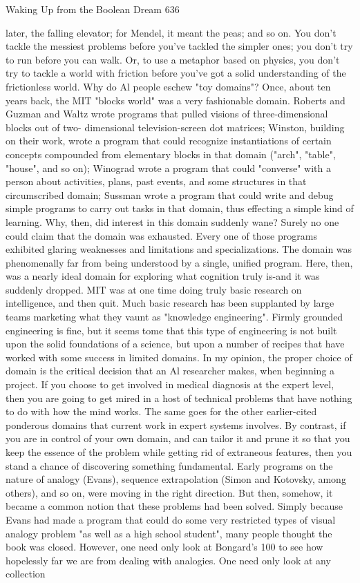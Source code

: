 Waking Up from the Boolean Dream                                                      636

later, the falling elevator; for Mendel, it meant the peas; and so on. You don't tackle
the messiest problems before you've tackled the simpler ones; you don't try to run
before you can walk. Or, to use a metaphor based on physics, you don't try to tackle a
world with friction before you've got a solid understanding of the frictionless world.
         Why do Al people eschew "toy domains"? Once, about ten years back, the
MIT "blocks world" was a very fashionable domain. Roberts and Guzman and Waltz
wrote programs that pulled visions of three-dimensional blocks out of two-
dimensional television-screen dot matrices; Winston, building on their work, wrote a
program that could recognize instantiations of certain concepts compounded from
elementary blocks in that domain ("arch", "table", "house", and so on); Winograd
wrote a program that could "converse" with a person about activities, plans, past
events, and some structures in that circumscribed domain; Sussman wrote a program
that could write and debug simple programs to carry out tasks in that domain, thus
effecting a simple kind of learning. Why, then, did interest in this domain suddenly
wane?
         Surely no one could claim that the domain was exhausted. Every one of those
programs exhibited glaring weaknesses and limitations and specializations. The
domain was phenomenally far from being understood by a single, unified program.
Here, then, was a nearly ideal domain for exploring what cognition truly is-and it was
suddenly dropped. MIT was at one time doing truly basic research on intelligence,
and then quit. Much basic research has been supplanted by large teams marketing
what they vaunt as "knowledge engineering". Firmly grounded engineering is fine,
but it seems tome that this type of engineering is not built upon the solid foundations
of a science, but upon a number of recipes that have worked with some success in
limited domains.
         In my opinion, the proper choice of domain is the critical decision that an Al
researcher makes, when beginning a project. If you choose to get involved in medical
diagnosis at the expert level, then you are going to get mired in a host of technical
problems that have nothing to do with how the mind works. The same goes for the
other earlier-cited ponderous domains that current work in expert systems involves.
By contrast, if you are in control of your own domain, and can tailor it and prune it so
that you keep the essence of the problem while getting rid of extraneous features, then
you stand a chance of discovering something fundamental.
         Early programs on the nature of analogy (Evans), sequence extrapolation
(Simon and Kotovsky, among others), and so on, were moving in the right direction.
But then, somehow, it became a common notion that these problems had been solved.
Simply because Evans had made a program that could do some very restricted types
of visual analogy problem "as well as a high school student", many people thought the
book was closed. However, one need only look at Bongard's 100 to see how
hopelessly far we are from dealing with analogies. One need only look at any
collection




